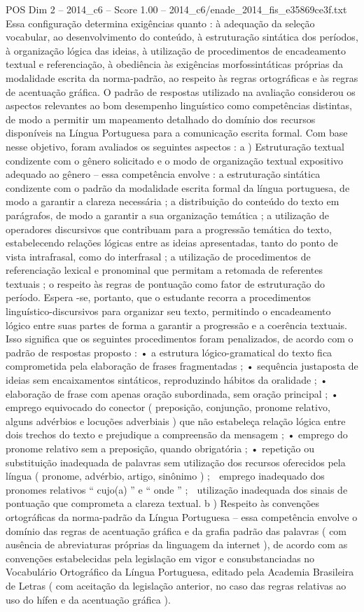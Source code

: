 \begin{textsample}{POS Dim 2 – 2014\_c6 – Score 1.00 – 2014\_c6/enade\_2014\_fis\_e35869ce3f.txt}
Essa configuração determina exigências quanto : à adequação da seleção vocabular, ao desenvolvimento do conteúdo, à estruturação sintática dos períodos, à organização lógica das ideias, à utilização de procedimentos de encadeamento textual e referenciação, à obediência às exigências morfossintáticas próprias da modalidade escrita da norma-padrão, ao respeito às regras ortográficas e às regras de acentuação gráfica.
O padrão de respostas utilizado na avaliação considerou os aspectos relevantes ao bom desempenho linguístico como competências distintas, de modo a permitir um mapeamento detalhado do domínio dos recursos disponíveis na Língua Portuguesa para a comunicação escrita formal.
Com base nesse objetivo, foram avaliados os seguintes aspectos : a ) Estruturação textual condizente com o gênero solicitado e o modo de organização textual expositivo adequado ao gênero – essa competência envolve : a estruturação sintática condizente com o padrão da modalidade escrita formal da língua portuguesa, de modo a garantir a clareza necessária ; a distribuição do conteúdo do texto em parágrafos, de modo a garantir a sua organização temática ; a utilização de operadores discursivos que contribuam para a progressão temática do texto, estabelecendo relações lógicas entre as ideias apresentadas, tanto do ponto de vista intrafrasal, como do interfrasal ; a utilização de procedimentos de referenciação lexical e pronominal que permitam a retomada de referentes textuais ; o respeito às regras de pontuação como fator de estruturação do período.
Espera -se, portanto, que o estudante recorra a procedimentos linguístico-discursivos para organizar seu texto, permitindo o encadeamento lógico entre suas partes de forma a garantir a progressão e a coerência textuais.
Isso significa que os seguintes procedimentos foram penalizados, de acordo com o padrão de respostas proposto : • a estrutura lógico-gramatical do texto fica comprometida pela elaboração de frases fragmentadas ; • sequência justaposta de ideias sem encaixamentos sintáticos, reproduzindo hábitos da oralidade ; • elaboração de frase com apenas oração subordinada, sem oração principal ; • emprego equivocado do conector ( preposição, conjunção, pronome relativo, alguns advérbios e locuções adverbiais ) que não estabeleça relação lógica entre dois trechos do texto e prejudique a compreensão da mensagem ; • emprego do pronome relativo sem a preposição, quando obrigatória ; • repetição ou substituição inadequada de palavras sem utilização dos recursos oferecidos pela língua ( pronome, advérbio, artigo, sinônimo ) ;  emprego inadequado dos pronomes relativos “ cujo(a) ” e “ onde ” ;  utilização inadequada dos sinais de pontuação que comprometa a clareza textual. b ) Respeito às convenções ortográficas da norma-padrão da Língua Portuguesa – essa competência envolve o domínio das regras de acentuação gráfica e da grafia padrão das palavras ( com ausência de abreviaturas próprias da linguagem da internet ), de acordo com as convenções estabelecidas pela legislação em vigor e consubstanciadas no Vocabulário Ortográfico da Língua Portuguesa, editado pela Academia Brasileira de Letras ( com aceitação da legislação anterior, no caso das regras relativas ao uso do hífen e da acentuação gráfica ).

\end{textsample}
